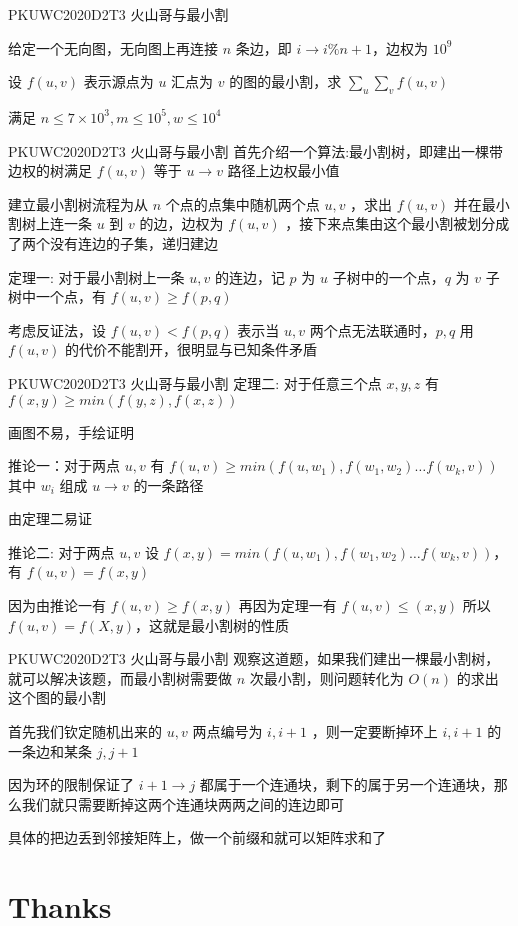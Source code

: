 \documentclass[9pt]{beamer}
\begin{document}
  \begin{frame}{PKUWC2020D2T3 火山哥与最小割}
    \par 给定一个无向图，无向图上再连接 $n$ 条边，即 $i\rightarrow i \% n + 1$，边权为 $10^9$
    \par 设 $f(u,v)$ 表示源点为 $u$ 汇点为 $v$ 的图的最小割，求 $\sum_u\sum_vf(u,v)$
    \par 满足 $n\leq 7\times 10^3,m\leq 10^5,w\leq10^4$
  \end{frame}

  \begin{frame}{PKUWC2020D2T3 火山哥与最小割}
     首先介绍一个算法:最小割树，即建出一棵带边权的树满足 $f(u,v)$ 等于 $u\rightarrow v$ 路径上边权最小值 

     建立最小割树流程为从 $n$ 个点的点集中随机两个点 $u,v$ ，求出 $f(u,v)$ 并在最小割树上连一条 $u$ 到 $v$ 的边，边权为 $f(u,v)$ ，接下来点集由这个最小割被划分成了两个没有连边的子集，递归建边

     定理一: 对于最小割树上一条 $u,v$ 的连边，记 $p$ 为 $u$ 子树中的一个点，$q$ 为 $v$ 子树中一个点，有 $f(u,v)\geq f(p, q)$

     考虑反证法，设 $f(u,v)<f(p,q)$ 表示当 $u,v$ 两个点无法联通时，$p,q$ 用 $f(u,v)$ 的代价不能割开，很明显与已知条件矛盾
  \end{frame}

  \begin{frame}{PKUWC2020D2T3 火山哥与最小割}
     定理二: 对于任意三个点 $x,y,z$ 有 $f(x,y)\geq min(f(y,z),f(x,z))$ 
    
     画图不易，手绘证明

     推论一：对于两点 $u,v$ 有 $f(u,v)\geq min(f(u,w_1),f(w_1,w_2)\dots f(w_k,v))$ 其中 $w_i$ 组成 $u\rightarrow v$ 的一条路径

     由定理二易证

     推论二: 对于两点 $u,v$ 设 $f(x,y)=min(f(u,w_1),f(w_1,w_2)\dots f(w_k,v))$，有 $f(u,v)=f(x,y)$

     因为由推论一有 $f(u,v)\geq f(x,y)$ 再因为定理一有 $f(u,v)\leq (x,y)$ 所以 $f(u,v)=f(X,y)$，这就是最小割树的性质
  \end{frame}

  \begin{frame}{PKUWC2020D2T3 火山哥与最小割}
     观察这道题，如果我们建出一棵最小割树，就可以解决该题，而最小割树需要做 $n$ 次最小割，则问题转化为 $O(n)$ 的求出这个图的最小割

     首先我们钦定随机出来的 $u,v$ 两点编号为 $i,i+1$ ，则一定要断掉环上 $i,i+1$ 的一条边和某条 $j,j+1$

     因为环的限制保证了 $i+1\rightarrow j$ 都属于一个连通块，剩下的属于另一个连通块，那么我们就只需要断掉这两个连通块两两之间的连边即可

     具体的把边丢到邻接矩阵上，做一个前缀和就可以矩阵求和了
  \end{frame}

  \section{Thanks}
\end{document}
